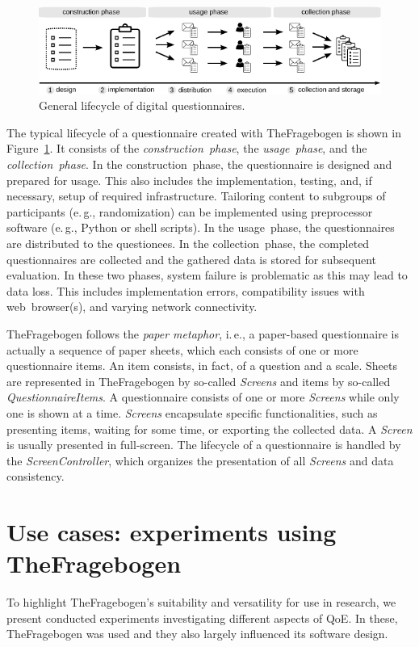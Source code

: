 \documentclass[conference,a4paper]{IEEEtran}
\newcommand{\ie}{i.\,e.}
\newcommand{\eg}{e.\,g.}
\begin{document}
\begin{figure}
  \centering
  \includegraphics[width=1\columnwidth]{fig/lifecycle}
  \caption{General lifecycle of digital questionnaires.}
  \label{lifecycle}
\vspace{-1em}
\end{figure}

The typical lifecycle of a questionnaire created with TheFragebogen is shown in Figure~\ref{lifecycle}.
It consists of the \emph{construction~phase}, the \emph{usage~phase}, and the \emph{collection~phase}.
In the construction~phase, the questionnaire is designed and prepared for usage.
This also includes the implementation, testing, and, if necessary, setup of required infrastructure.
Tailoring content to subgroups of participants (\eg, randomization) can be implemented using preprocessor software (\eg, Python or shell scripts).
In the usage~phase, the questionnaires are distributed to the questionees.
In the collection~phase, the completed questionnaires are collected and the gathered data is stored for subsequent evaluation.
In these two phases, system failure is problematic as this may lead to data loss.
This includes implementation errors, compatibility issues with web~browser(s), and varying network connectivity.

TheFragebogen follows the \emph{paper metaphor}, \ie, a paper-based questionnaire is actually a sequence of paper sheets, which each consists of one or more questionnaire items.
An item consists, in fact, of a question and a scale.
Sheets are represented in TheFragebogen by so-called \emph{Screens} and items by so-called \emph{QuestionnaireItems}.
A questionnaire consists of one or more \emph{Screens} while only one is shown at a time.
\emph{Screens} encapsulate specific functionalities, such as presenting items, waiting for some time, or exporting the collected data.
A \emph{Screen} is usually presented in full-screen.
The lifecycle of a questionnaire is handled by the \emph{ScreenController}, which organizes the presentation of all \emph{Screens} and data consistency.

\section{Use cases: experiments using TheFragebogen}\label{sec:usecases}
To highlight TheFragebogen's suitability and versatility for use in research, we present conducted experiments investigating different aspects of QoE.
In these, TheFragebogen was used and they also largely influenced its software design.
\end{document}
